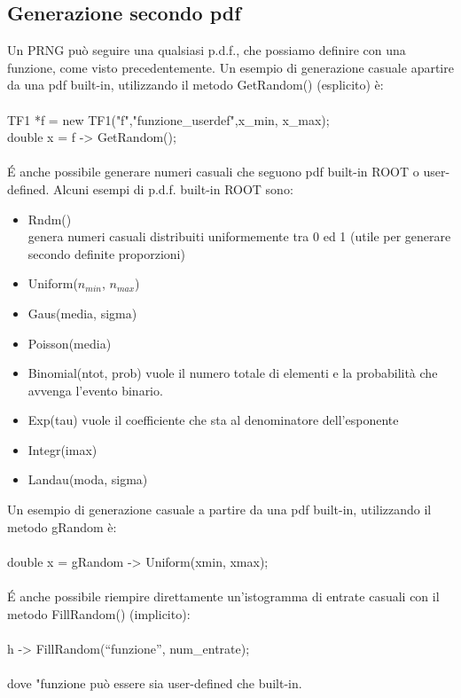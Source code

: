 \documentclass[10pt,a4paper]{article}
\begin{document}
\subsection{Generazione secondo pdf}
Un PRNG può seguire una qualsiasi p.d.f., che possiamo definire con una funzione, come visto precedentemente. Un esempio di generazione casuale apartire da una pdf built-in, utilizzando il metodo GetRandom() (esplicito) è:\\\\
TF1 *f = new TF1("f","funzione\_userdef",x\_min, x\_max);\\
double x = f -> GetRandom();\\\\
\'E anche possibile generare numeri casuali che seguono pdf built-in ROOT o user-defined. Alcuni esempi di p.d.f. built-in ROOT sono: 
\begin{itemize}
	\item Rndm()\\
	genera numeri casuali distribuiti uniformemente tra 0 ed 1 (utile per generare secondo definite proporzioni)
	\item Uniform(\(n_{min}\), \(n_{max}\))
	\item Gaus(media, sigma)
	\item Poisson(media)
	\item Binomial(ntot, prob)
	vuole il numero totale di elementi e la probabilità che avvenga l'evento binario.
	\item Exp(tau)
	vuole il coefficiente che sta al denominatore dell'esponente
	\item Integr(imax)	
	\item Landau(moda, sigma)
\end{itemize}
Un esempio di generazione casuale a partire da una pdf built-in, utilizzando il metodo gRandom è:\\\\
double x = gRandom -> Uniform(xmin, xmax);\\\\
\'{E} anche possibile riempire direttamente un'istogramma di entrate casuali con il metodo FillRandom() (implicito):\\\\
 h -> FillRandom(“funzione”, num\_entrate);\\\\
dove "funzione può essere sia user-defined che built-in. 
\newpage
\end{document}
